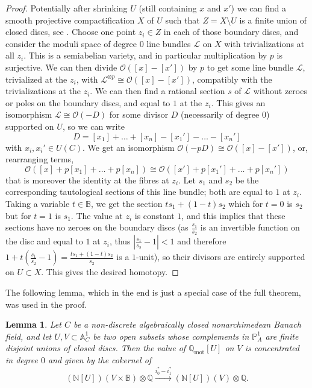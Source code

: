 \documentclass[11pt]{amsart}
\numberwithin{equation}{section}
\numberwithin{theorem}{section}
\newtheorem{lemma}[theorem]{Lemma}
\theoremstyle{definition}
\begin{document}
\begin{proof} Potentially after shrinking $U$ (still containing $x$ and $x'$) we can find a smooth projective compactification $X$ of $U$ such that $Z=X\setminus U$ is a finite union of closed discs, see \cite[Corollary 1.3]{vanderPut}. Choose one point $z_i\in Z$ in each of those boundary discs, and consider the moduli space of degree $0$ line bundles $\mathcal L$ on $X$ with trivializations at all $z_i$. This is a semiabelian variety, and in particular multiplication by $p$ is surjective. We can then divide $\mathcal O([x]-[x'])$ by $p$ to get some line bundle $\mathcal L$, trivialized at the $z_i$, with $\mathcal L^{\otimes p}\cong \mathcal O([x]-[x'])$, compatibly with the trivializations at the $z_i$. We can then find a rational section $s$ of $\mathcal L$ without zeroes or poles on the boundary discs, and equal to $1$ at the $z_i$. This gives an isomorphism $\mathcal L\cong \mathcal O(-D)$ for some divisor $D$ (necessarily of degree $0$) supported on $U$, so we can write
\[
D=[x_1]+\ldots+[x_n]-[x_1']-\ldots-[x_n']
\]
with $x_i,x_i'\in U(C)$. We get an isomorphism $\mathcal O(-pD)\cong \mathcal O([x]-[x'])$, or, rearranging terms,
\[
\mathcal O([x]+p[x_1]+\ldots+p[x_n])\cong \mathcal O([x']+p[x_1']+\ldots+p[x_n'])
\]
that is moreover the identity at the fibres at $z_i$. Let $s_1$ and $s_2$ be the corresponding tautological sections of this line bundle; both are equal to $1$ at $z_i$. Taking a variable $t\in \mathbb B$, we get the section $ts_1 + (1-t) s_2$ which for $t=0$ is $s_2$ but for $t=1$ is $s_1$. The value at $z_i$ is constant $1$, and this implies that these sections have no zeroes on the boundary discs (as $\frac{s_1}{s_2}$ is an invertible function on the disc and equal to $1$ at $z_i$, thus $|\frac{s_1}{s_2}-1|<1$ and therefore $1 + t(\frac{s_1}{s_2}-1) = \frac{ts_1+(1-t)s_2}{s_2}$ is a $1$-unit), so their divisors are entirely supported on $U\subset X$. This gives the desired homotopy.
\end{proof}

The following lemma, which in the end is just a special case of the full theorem, was used in the proof.

\begin{lemma}\label{lem:toycase} Let $C$ be a non-discrete algebraically closed nonarchimedean Banach field, and let $U,V\subset \mathbb A^1_C$ be two open subsets whose complements in $\mathbb P^1_A$ are finite disjoint unions of closed discs. Then the value of $\mathbb Q_{\mathrm{mot}}[U]$ on $V$ is concentrated in degree $0$ and given by the cokernel of
\[
(\mathbb N[U])(V\times \mathbb B)\otimes \mathbb Q\xrightarrow{i_0^\ast-i_1^\ast}(\mathbb N[U])(V)\otimes \mathbb Q.
\]
\end{lemma}
\end{document}
